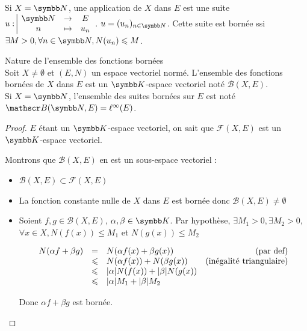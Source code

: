 \begin{exemple}
    Si $X = \N$, une application de $X$ dans $E$ est une suite $\fonction{u}{\N}{E}{n}{u_n}$.
    $u = (u_n)_{n \in \N}$.
    Cette suite est bornée ssi $\exists M > 0, \forall n \in \N, N(u_n) \leqslant M$.
\end{exemple}

\begin{proposition}{Nature de l'ensemble des fonctions bornées}{}
    \\Soit $X \neq \emptyset$ et $(E, N)$ un espace vectoriel normé. 
    L'ensemble des fonctions bornées de $X$ dans $E$ est un $\K$-espace vectoriel noté
    $\mathscr B(X, E)$. \\

    Si $X = \N$, l'ensemble des suites bornées sur $E$ est noté $\mathscr B(\N, E) = \ell^\infty (E)$.
\end{proposition}

\begin{proof}
    $E$ étant un $\K$-espace vectoriel, on sait que $\mathscr F(X, E)$ est un 
    $\K$-espace vectoriel. 
    
    Montrons que $\mathscr B(X, E)$ en est un sous-espace vectoriel :
    \begin{itemize}
        \item $\mathscr B(X, E) \subset \mathscr F(X, E)$
        \item La fonction constante nulle de $X$ dans $E$ est bornée donc $\mathscr B(X, E) \neq \emptyset$
        \item Soient $f, g \in \mathscr B(X, E)$, $\alpha, \beta \in \K$. Par hypothèse, 
            $\exists M_1 > 0, \exists M_2 > 0$, $\forall x \in X, N(f(x)) \leqslant M_1$ et 
            $N(g(x)) \leqslant M_2$

            \[
            \begin{array}{rclr}
                N(\alpha f + \beta g ) & = & N(\alpha f(x) + \beta g(x)) & \text{(par def)} \\
                \space & \leqslant & N(\alpha f(x)) + N(\beta g(x)) & \text{(inégalité triangulaire)} \\
                \space & \leqslant & |\alpha| N(f(x)) + |\beta| N(g(x)) \\
                \space & \leqslant & |\alpha| M_1 + |\beta| M_2\\
            \end{array}
            \]
            
            Donc $\alpha f + \beta g$ est bornée. 
    \end{itemize}
\end{proof}

